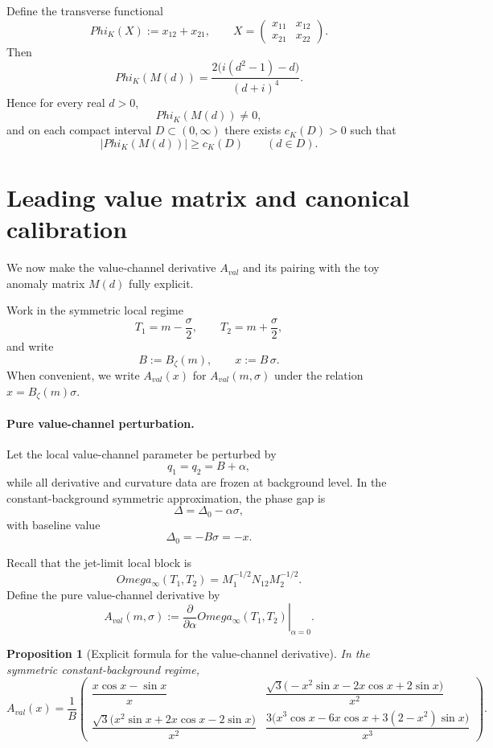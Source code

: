 \documentclass[11pt,a4paper]{amsart}
\def\Omega{Omega}%
\def\Phi{Phi}%
\def\val{val}%
\theoremstyle{plain}
\newtheorem{proposition}[theorem]{Proposition}
\theoremstyle{definition}
\newcommand{\val}{\mathrm{val}}
\begin{document}
Define the transverse functional
\begin{equation}\label{eq:Phi-K}
\Phi_K(X):=x_{12}+x_{21},
\qquad
X=\begin{pmatrix}x_{11}&x_{12}\\x_{21}&x_{22}\end{pmatrix}.
\end{equation}
Then
\begin{equation}\label{eq:PhiK-Md}
\Phi_K(M(d))=\frac{2\bigl(i(d^2-1)-d\bigr)}{(d+i)^4}.
\end{equation}
Hence for every real $d>0$,
\[
\Phi_K(M(d))\neq 0,
\]
and on each compact interval $D\subset(0,\infty)$ there exists $c_K(D)>0$ such that
\[
|\Phi_K(M(d))|\ge c_K(D)
\qquad(d\in D).
\]

\section{Leading value matrix and canonical calibration}

We now make the value-channel derivative $A_{\val}$ and its pairing with the
toy anomaly matrix $M(d)$ fully explicit.

Work in the symmetric local regime
\[
T_1=m-\frac{\sigma}{2},
\qquad
T_2=m+\frac{\sigma}{2},
\]
and write
\[
B:=B_\zeta(m),
\qquad
x:=B\,\sigma.
\]
When convenient, we write $A_{\val}(x)$ for $A_{\val}(m,\sigma)$ under the
relation $x=B_\zeta(m)\sigma$.

\paragraph{Pure value-channel perturbation.}
Let the local value-channel parameter be perturbed by
\[
q_1=q_2=B+\alpha,
\]
while all derivative and curvature data are frozen at background level. In the
constant-background symmetric approximation, the phase gap is
\[
\Delta=\Delta_0-\alpha\sigma,
\]
with baseline value
\[
\Delta_0=-B\sigma=-x.
\]

Recall that the jet-limit local block is
\[
\Omega_\infty(T_1,T_2)=M_1^{-1/2}N_{12}M_2^{-1/2}.
\]
Define the pure value-channel derivative by
\begin{equation}\label{eq:A-val-def}
A_{\val}(m,\sigma):=
\left.\frac{\partial}{\partial\alpha}\Omega_\infty(T_1,T_2)\right|_{\alpha=0}.
\end{equation}

\begin{proposition}[Explicit formula for the value-channel derivative]
\label{prop:explicit-Aval}
In the symmetric constant-background regime,
\[
A_{\val}(x)=\frac1B
\begin{pmatrix}
\dfrac{x\cos x-\sin x}{x}
&
\dfrac{\sqrt3\bigl(-x^2\sin x-2x\cos x+2\sin x\bigr)}{x^2}
\\[2.5ex]
\dfrac{\sqrt3\bigl(x^2\sin x+2x\cos x-2\sin x\bigr)}{x^2}
&
\dfrac{3\bigl(x^3\cos x-6x\cos x+3(2-x^2)\sin x\bigr)}{x^3}
\end{pmatrix}.
\]
\end{proposition}
\end{document}
